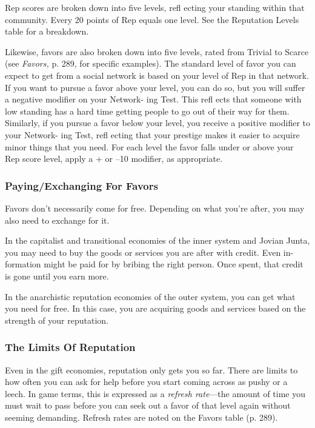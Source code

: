 Rep scores are broken down into five levels, refl ecting 
your standing within that community. Every 20 points 
of Rep equals one level. See the Reputation Levels 
table for a breakdown.

Likewise, favors are also broken down into five 
levels, rated from Trivial to Scarce (see \textit{Favors,} p. 289, 
for specific examples). The standard level of favor 
you can expect to get from a social network is based 
on your level of Rep in that network. If you want to 
pursue a favor above your level, you can do so, but 
you will suffer a negative modifier on your Network-
ing Test. This refl ects that someone with low standing 
has a hard time getting people to go out of their way 
for them. Similarly, if you pursue a favor below your 
level, you receive a positive modifier to your Network-
ing Test, refl ecting that your prestige makes it easier to 
acquire minor things that you need. For each level the 
favor falls under or above your Rep score level, apply 
a + or –10 modifier, as appropriate.

\subsubsection{Paying/Exchanging For Favors}

Favors don't necessarily come for free. Depending on 
what you're after, you may also need to exchange for it.

In the capitalist and transitional economies of the 
inner system and Jovian Junta, you may need to buy 
the goods or services you are after with credit. Even in-
formation might be paid for by bribing the right person. 
Once spent, that credit is gone until you earn more.

In the anarchistic reputation economies of the outer 
system, you can get what you need for free. In this 
case, you are acquiring goods and services based on 
the strength of your reputation.

\subsubsection{The Limits Of Reputation}

Even in the gift economies, reputation only gets you so 
far. There are limits to how often you can ask for help 
before you start coming across as pushy or a leech. In 
game terms, this is expressed as a \textit{refresh rate}—the 
amount of time you must wait to pass before you can 
seek out a favor of that level again without seeming 
demanding. Refresh rates are noted on the Favors 
table (p. 289).

